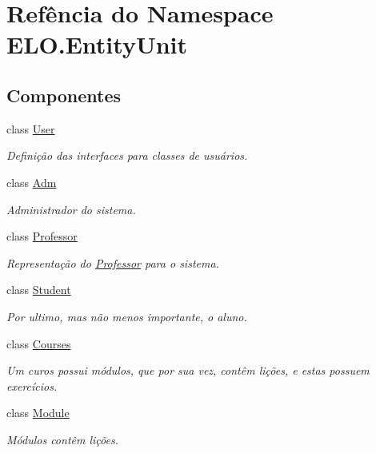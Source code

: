 \hypertarget{namespaceELO_1_1EntityUnit}{\section{Refência do Namespace E\-L\-O.\-Entity\-Unit}
\label{d2/d07/namespaceELO_1_1EntityUnit}
}
\subsection*{Componentes}
\begin{DoxyCompactItemize}
\item 
class \hyperlink{classELO_1_1EntityUnit_1_1User}{User}
\begin{DoxyCompactList}\small\item\em Definição das interfaces para classes de usuários. \end{DoxyCompactList}\item 
class \hyperlink{classELO_1_1EntityUnit_1_1Adm}{Adm}
\begin{DoxyCompactList}\small\item\em Administrador do sistema. \end{DoxyCompactList}\item 
class \hyperlink{classELO_1_1EntityUnit_1_1Professor}{Professor}
\begin{DoxyCompactList}\small\item\em Representação do \hyperlink{classELO_1_1EntityUnit_1_1Professor}{Professor} para o sistema. \end{DoxyCompactList}\item 
class \hyperlink{classELO_1_1EntityUnit_1_1Student}{Student}
\begin{DoxyCompactList}\small\item\em Por ultimo, mas não menos importante, o aluno. \end{DoxyCompactList}\item 
class \hyperlink{classELO_1_1EntityUnit_1_1Courses}{Courses}
\begin{DoxyCompactList}\small\item\em Um curos possui módulos, que por sua vez, contêm lições, e estas possuem exercícios. \end{DoxyCompactList}\item 
class \hyperlink{classELO_1_1EntityUnit_1_1Module}{Module}
\begin{DoxyCompactList}\small\item\em Módulos contêm lições. \end{DoxyCompactList}\item 

\end{DoxyCompactItemize}
